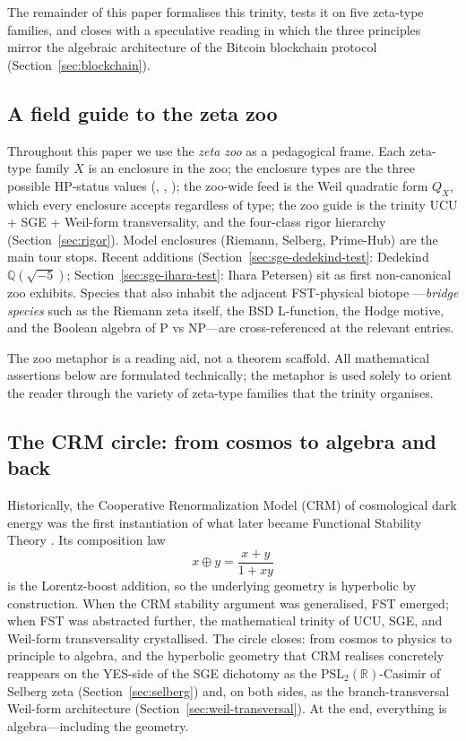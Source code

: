 \documentclass[11pt]{article}
\theoremstyle{definition}
\theoremstyle{remark}
\newcommand{\PSL}{\mathrm{PSL}}
\begin{document}
The remainder of this paper formalises this trinity, tests it on
five zeta-type families, and closes with a speculative reading in
which the three principles mirror the algebraic architecture of the
Bitcoin blockchain protocol (Section~\ref{sec:blockchain}).

\subsection{A field guide to the zeta zoo}
\label{sec:zoo-framing}

Throughout this paper we use the \emph{zeta zoo} as a pedagogical
frame. Each zeta-type family $X$ is an enclosure in the zoo; the
enclosure types are the three possible HP-status values
(, , ); the zoo-wide feed is the Weil
quadratic form $Q_X$, which every enclosure accepts regardless of
type; the zoo guide is the trinity UCU + SGE + Weil-form
transversality, and the four-class rigor hierarchy
(Section~\ref{sec:rigor}). Model enclosures (Riemann, Selberg,
Prime-Hub) are the main tour stops. Recent additions
(Section~\ref{sec:sge-dedekind-test}: Dedekind
$\mathbb{Q}(\sqrt{-5})$; Section~\ref{sec:sge-ihara-test}: Ihara
Petersen) sit as first non-canonical zoo exhibits. Species that
also inhabit the adjacent FST-physical biotope
\cite{RFEPFramework}---\emph{bridge species} such as the Riemann
zeta itself, the BSD L-function, the Hodge motive, and the Boolean
algebra of P vs NP---are cross-referenced at the relevant entries.

The zoo metaphor is a reading aid, not a theorem scaffold. All
mathematical assertions below are formulated technically; the
metaphor is used solely to orient the reader through the variety
of zeta-type families that the trinity organises.

\subsection{The CRM circle: from cosmos to algebra and back}
\label{sec:crm-circle}

Historically, the Cooperative Renormalization Model (CRM) of
cosmological dark energy was the first instantiation of what later
became Functional Stability Theory \cite{RFEPFramework}. Its
composition law
\[
  x \oplus y = \frac{x + y}{1 + xy}
\]
is the Lorentz-boost addition, so the underlying geometry is
hyperbolic by construction. When the CRM stability argument was
generalised, FST emerged; when FST was abstracted further, the
mathematical trinity of UCU, SGE, and Weil-form transversality
crystallised. The circle closes: from cosmos to physics to
principle to algebra, and the hyperbolic geometry that CRM realises
concretely reappears on the YES-side of the SGE dichotomy as the
$\PSL_2(\mathbb{R})$-Casimir of Selberg zeta
(Section~\ref{sec:selberg}) and, on both sides, as the
branch-transversal Weil-form architecture
(Section~\ref{sec:weil-transversal}). At the end, everything is
algebra---including the geometry.
\end{document}
